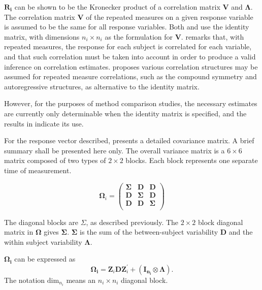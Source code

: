 \documentclass[MAIN.tex]{subfiles}
\begin{document}
$\boldsymbol{R_{i}}$ can be shown to be the Kronecker product of a correlation matrix $\boldsymbol{V}$ and $\boldsymbol{\Lambda}$. The correlation matrix $\boldsymbol{V}$ of the repeated measures on a given response variable is assumed to be the same for all response variables. Both \citet{hamlett} and \citet{lam} use the identity matrix, with dimensions $n_{i} \times n_{i}$ as the formulation for $\boldsymbol{V}$. \citet{ARoy2009} remarks that, with repeated measures, the response for each subject is correlated for each variable, and that such correlation must be taken into account in order to produce a valid inference on correlation estimates.  \citet{ARoy20092006} proposes various correlation structures may be assumed for repeated measure correlations, such as the compound symmetry and autoregressive structures, as alternative to the identity matrix.

However, for the purposes of method comparison studies, the necessary estimates are currently only determinable when the identity matrix is specified, and the results in \citet{ARoy2009} indicate its use.

For the response vector described, \citet{hamlett} presents a detailed covariance matrix. A brief summary shall be presented here only. The overall variance matrix is a $6 \times 6$ matrix composed of two types of $2 \times 2$ blocks. Each block represents one separate time of measurement.

\[
\boldsymbol{\Omega}_{i} = \left(
\begin{array}{ccc}
\boldsymbol{\Sigma} & \boldsymbol{D} & \boldsymbol{D}\\
\boldsymbol{D} & \boldsymbol{\Sigma} & \boldsymbol{D}\\
\boldsymbol{D} & \boldsymbol{D} & \boldsymbol{\Sigma}\\
\end{array}\right)
\]

The diagonal blocks are $\Sigma$, as described previously. The $2 \times 2$ block diagonal matrix in $\boldsymbol{\Omega}$ gives $\boldsymbol{\Sigma}$. $\boldsymbol{\Sigma}$ is the sum of the between-subject variability $\boldsymbol{D}$ and the within subject variability $\boldsymbol{\Lambda}$.

$\boldsymbol{\Omega_{i}}$ can be expressed as
\[
\boldsymbol{\Omega_{i}} = \boldsymbol{Z}_{i}\boldsymbol{D}\boldsymbol{Z}_{i}^\prime + ({\boldsymbol{I_{n_{i}}} \otimes \boldsymbol{\Lambda}}).
\]
The notation $\mbox{dim}_{n_{i}}$ means an $n_{i} \times n_{i}$ diagonal block.
\end{document}

